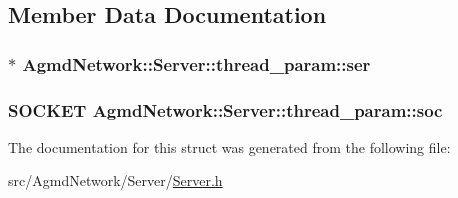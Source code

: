 \subsection{Member Data Documentation}
\hypertarget{struct_agmd_network_1_1_server_1_1thread__param_a18b557f0dd1b206db390c4468d9d2637}{
\subsubsection[{ser}]{$\ast$ Agmd\+Network\+::\+Server\+::thread\+\_\+param\+::ser}}\label{struct_agmd_network_1_1_server_1_1thread__param_a18b557f0dd1b206db390c4468d9d2637}
\hypertarget{struct_agmd_network_1_1_server_1_1thread__param_a0069978413f8477913f695b8418b9251}{
\subsubsection[{soc}]{\setlength{\rightskip}{0pt plus 5cm}S\+O\+C\+K\+E\+T Agmd\+Network\+::\+Server\+::thread\+\_\+param\+::soc}}\label{struct_agmd_network_1_1_server_1_1thread__param_a0069978413f8477913f695b8418b9251}


The documentation for this struct was generated from the following file\+:\begin{DoxyCompactItemize}
\item 
src/\+Agmd\+Network/\+Server/\hyperlink{_server_8h}{Server.\+h}\end{DoxyCompactItemize}
